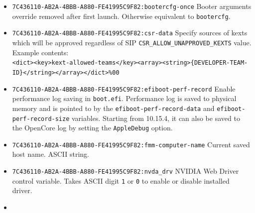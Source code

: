 \documentclass[]{article}
\begin{document}
\begin{itemize}
\begin{itemize}
\begin{itemize}
  \item \texttt{1} --- enables print something to BOOTER.LOG (stripped code implies there
  may be a crash)
  \item \texttt{2} --- enables perf logging to /efi/debug-log in the device three
  \item \texttt{4} --- enables timestamp printing for styled printf calls
  \end{itemize}
  \item \texttt{level=VALUE}  --- deprecated starting from 10.15. Verbosity level of
  DEBUG output. Everything but \texttt{0x80000000} is stripped from the binary,
  and this is the default value.
  \end{itemize}

  \emph{Note}: Enable the \texttt{AppleDebug} option to display verbose output from \texttt{boot.efi}
  on modern macOS versions. This will save the log to the general OpenCore log file. For versions before
  10.15.4, set \texttt{bootercfg} to \texttt{log=1}. This will print verbose output onscreen.
\item \texttt{7C436110-AB2A-4BBB-A880-FE41995C9F82:bootercfg-once}
  \break
  Booter arguments override removed after first launch. Otherwise equivalent to \texttt{bootercfg}.
\item \texttt{7C436110-AB2A-4BBB-A880-FE41995C9F82:csr-data}
  \break
  Specify sources of kexts which will be approved regardless of SIP \texttt{CSR\_ALLOW\_UNAPPROVED\_KEXTS} value.\\
  Example contents:\\
  \texttt{<dict><key>kext-allowed-teams</key><array><string>\{DEVELOPER-TEAM-ID\}</string></array></dict>\%00}
\item \texttt{7C436110-AB2A-4BBB-A880-FE41995C9F82:efiboot-perf-record}
  \break
  Enable performance log saving in \texttt{boot.efi}. Performance log is saved to physical
  memory and is pointed to by the \texttt{efiboot-perf-record-data} and \texttt{efiboot-perf-record-size}
  variables. Starting from 10.15.4, it can also be saved to the OpenCore log by setting the
  \texttt{AppleDebug} option.
\item
  \texttt{7C436110-AB2A-4BBB-A880-FE41995C9F82:fmm-computer-name}
  \break
  Current saved host name. ASCII string.
\item
  \texttt{7C436110-AB2A-4BBB-A880-FE41995C9F82:nvda\_drv}
  \break
  NVIDIA Web Driver control variable. Takes ASCII digit \texttt{1} or \texttt{0}
  to enable or disable installed driver.
\item

\end{itemize}
\end{document}
